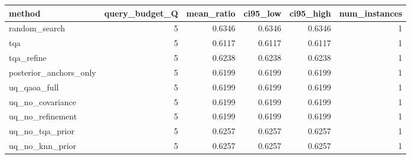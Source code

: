 \begin{tabular}{lrrrrr}
\toprule
method & query_budget_Q & mean_ratio & ci95_low & ci95_high & num_instances \\
\midrule
random_search & 5 & 0.6346 & 0.6346 & 0.6346 & 1 \\
tqa & 5 & 0.6117 & 0.6117 & 0.6117 & 1 \\
tqa_refine & 5 & 0.6238 & 0.6238 & 0.6238 & 1 \\
posterior_anchors_only & 5 & 0.6199 & 0.6199 & 0.6199 & 1 \\
uq_qaoa_full & 5 & 0.6199 & 0.6199 & 0.6199 & 1 \\
uq_no_covariance & 5 & 0.6199 & 0.6199 & 0.6199 & 1 \\
uq_no_refinement & 5 & 0.6199 & 0.6199 & 0.6199 & 1 \\
uq_no_tqa_prior & 5 & 0.6257 & 0.6257 & 0.6257 & 1 \\
uq_no_knn_prior & 5 & 0.6257 & 0.6257 & 0.6257 & 1 \\
\bottomrule
\end{tabular}

